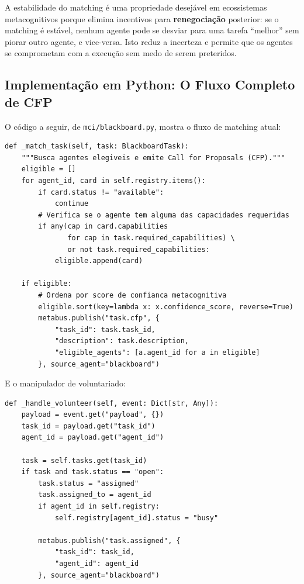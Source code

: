 A estabilidade do matching é uma propriedade desejável em ecossistemas metacognitivos porque elimina incentivos para \textbf{renegociação} posterior: se o matching é estável, nenhum agente pode se desviar para uma tarefa ``melhor'' sem piorar outro agente, e vice-versa. Isto reduz a incerteza e permite que os agentes se comprometam com a execução sem medo de serem preteridos.

\subsection{Implementação em Python: O Fluxo Completo de CFP}

O código a seguir, de \texttt{mci/blackboard.py}, mostra o fluxo de matching atual:

\begin{verbatim}
def _match_task(self, task: BlackboardTask):
    """Busca agentes elegiveis e emite Call for Proposals (CFP)."""
    eligible = []
    for agent_id, card in self.registry.items():
        if card.status != "available":
            continue
        # Verifica se o agente tem alguma das capacidades requeridas
        if any(cap in card.capabilities
               for cap in task.required_capabilities) \
               or not task.required_capabilities:
            eligible.append(card)

    if eligible:
        # Ordena por score de confianca metacognitiva
        eligible.sort(key=lambda x: x.confidence_score, reverse=True)
        metabus.publish("task.cfp", {
            "task_id": task.task_id,
            "description": task.description,
            "eligible_agents": [a.agent_id for a in eligible]
        }, source_agent="blackboard")
\end{verbatim}

E o manipulador de voluntariado:

\begin{verbatim}
def _handle_volunteer(self, event: Dict[str, Any]):
    payload = event.get("payload", {})
    task_id = payload.get("task_id")
    agent_id = payload.get("agent_id")

    task = self.tasks.get(task_id)
    if task and task.status == "open":
        task.status = "assigned"
        task.assigned_to = agent_id
        if agent_id in self.registry:
            self.registry[agent_id].status = "busy"

        metabus.publish("task.assigned", {
            "task_id": task_id,
            "agent_id": agent_id
        }, source_agent="blackboard")
\end{verbatim}

